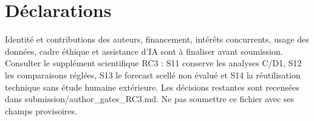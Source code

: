 \documentclass[french]{IOS-Book-Article}
\begin{document}
\begin{frontmatter}
\title{\PaperTitle}
\author{\PaperAuthors}
\address{\PaperAffiliation}
\begin{abstract}

\end{abstract}
\begin{keyword}
\PaperKeywords
\end{keyword}
\end{frontmatter}

\section*{Déclarations}
Identité et contributions des auteurs, financement, intérêts concurrents, usage des données, cadre éthique et assistance d'IA sont à finaliser avant soumission. Consulter le supplément scientifique RC3 : S11 conserve les analyses C/D1, S12 les comparaisons réglées, S13 le forecast scellé non évalué et S14 la réutilisation technique sans étude humaine extérieure. Les décisions restantes sont recensées dans submission/author_gates_RC3.md. Ne pas soumettre ce fichier avec ses champs provisoires.


\end{document}
